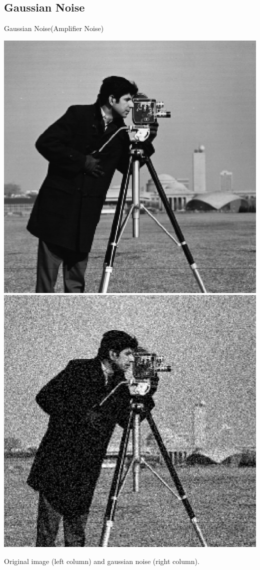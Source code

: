 \documentclass{beamer}
\begin{document}
\subsection{Gaussian Noise}
\begin{frame}{Gaussian Noise(Amplifier Noise)}

\vspace{1cm}
\begin{center}

    
    \includegraphics[width=0.4\columnwidth]{images/salt_pepper_origin.jpg}
    \includegraphics[width=0.4\columnwidth]{images/gaussian_noise.jpg}
	
	Original image (left column) and gaussian noise (right column).
	


\end{center}
\end{frame}
\end{document}
